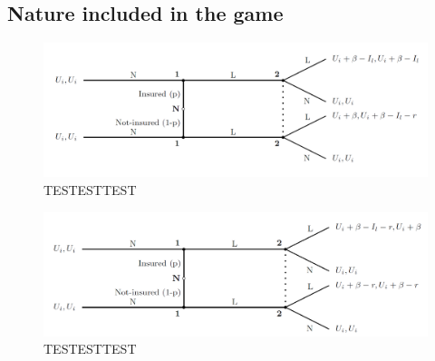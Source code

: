 \subsection{Nature included in the game}


\begin{figure}[h]
\centering

  \centering
\includegraphics[width=1\linewidth]{../Figures/SignalingGameInsured.png}

\caption{TESTESTTEST}



\end{figure}
\begin{figure}[h]
\centering

  \centering
\includegraphics[width=1\linewidth]{../Figures/SignalingGameNotInsured.png}

\caption{TESTESTTEST}



\end{figure}

